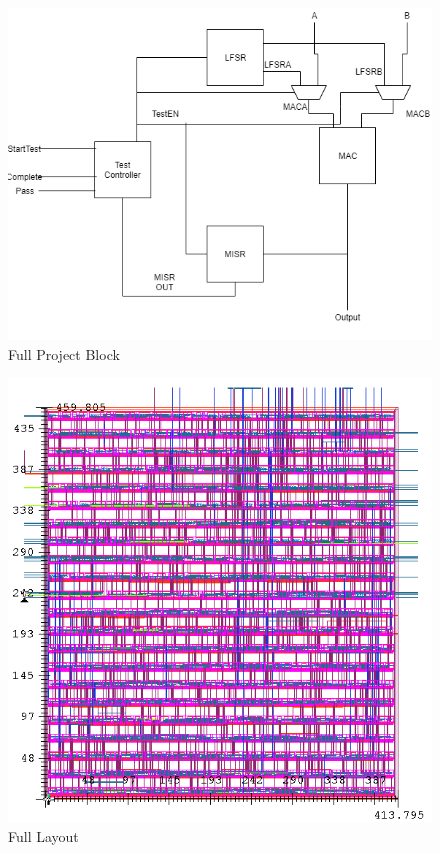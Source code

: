 \documentclass[11pt]{article}
\begin{document}
	
	\begin{figure}[H] 
		\centering 
		\includegraphics[width=0.7\linewidth]{"Pictures/Full-Project-Block"}
		\caption{Full Project Block} 
		\label{fig:Full-Project-Block} 
	\end{figure}
	
	
	\begin{figure}[H] 
		\centering 
		\includegraphics[width=0.7\linewidth]{"Pictures/Full Layout"}
		\caption{Full Layout} 
		\label{fig:Full-Layout} 
	\end{figure}
	
\end{document}
